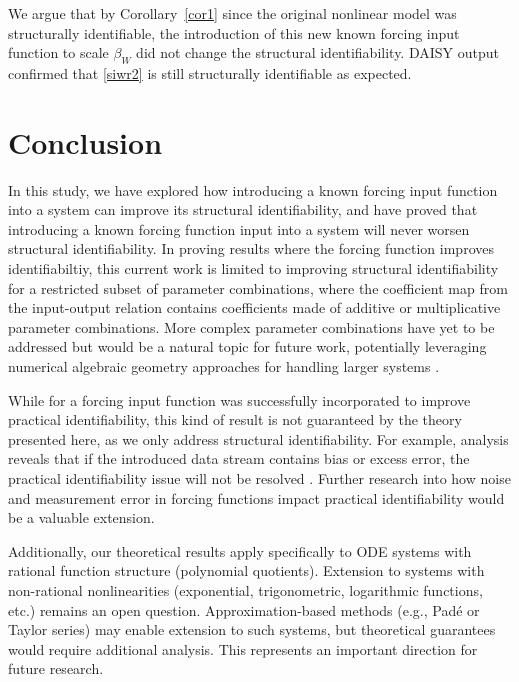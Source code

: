 \documentclass[a4paper,fleqn]{cas-dc}
\theoremstyle{definition}
\begin{document}
We argue that by Corollary~\ref{cor1} since the original nonlinear model was structurally identifiable, the introduction of this new known forcing input function to scale $\beta_W$ did not change the structural identifiability.
DAISY output confirmed that \cref{siwr2} is still structurally identifiable as expected.


\section{Conclusion} \label{s:conclusions}

\noindent In this study, we have explored how introducing a known forcing input function into a system can improve its structural identifiability, and have proved that introducing a known forcing function input into a system will never worsen structural identifiability.
In proving results where the forcing function improves identifiabiltiy, this current work is limited to improving structural identifiability for a restricted subset of parameter combinations, where the coefficient map from the input-output relation contains coefficients made of additive or multiplicative parameter combinations.
More complex parameter combinations have yet to be addressed but would be a natural topic for future work, potentially leveraging numerical algebraic geometry approaches for handling larger systems \cite{bates2019identifiability}.

While for \citet{eisenberg2013examining} a forcing input function was successfully incorporated to improve practical identifiability, this kind of result is not guaranteed by the theory presented here, as we only address structural identifiability.
For example, analysis reveals that if the introduced data stream contains bias or excess error, the practical identifiability issue will not be resolved \cite{murphy2024measurement}. Further research into how noise and measurement error in forcing functions impact practical identifiability would be a valuable extension.


Additionally, our theoretical results apply specifically to ODE systems with rational function structure (polynomial quotients). Extension to systems with non-rational nonlinearities (exponential, trigonometric, logarithmic functions, etc.) remains an open question. Approximation-based methods (e.g., Padé or Taylor series) may enable extension to such systems, but theoretical guarantees would require additional analysis. This represents an important direction for future research.
\end{document}
